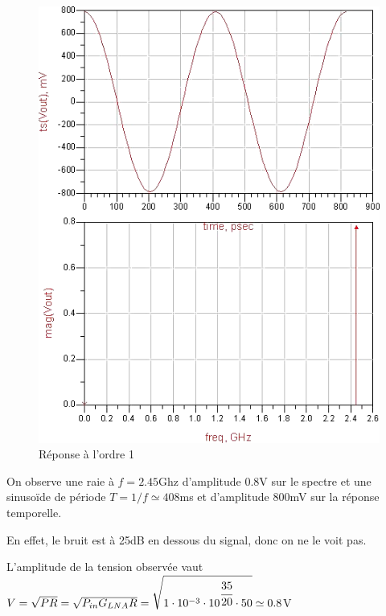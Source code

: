 \documentclass[10pt]{article}
\begin{document}
\begin{figure}
    \begin{center}
        \includegraphics{p6_simu_1}
    \end{center}
    \caption{Réponse à l’ordre 1}
\end{figure}

On observe une raie à $f=2.45$Ghz d’amplitude 0.8V sur le spectre et une sinusoïde de période $T=1/f\simeq408$ms et d’amplitude 800mV sur la réponse temporelle.

En effet, le bruit est à 25dB en dessous du signal, donc on ne le voit pas.

L’amplitude de la tension observée vaut $V=\sqrt{PR}=\sqrt{P_{in}G_{LNA}R} = \sqrt{1\cdot 10^{-3}\cdot 10^{\cfrac{35}{20}}\cdot 50} \simeq 0.8$V
\end{document}
